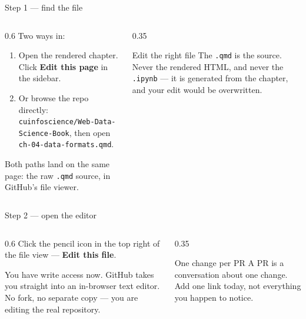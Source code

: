 \documentclass[9pt,aspectratio=169]{beamer}
\begin{document}
\begin{frame}{Step 1 --- find the file}
    \begin{columns}[T]
        \begin{column}{0.6\textwidth}
            Two ways in:
            \begin{enumerate}\small
                \item Open the rendered chapter. Click \textbf{Edit this page} in the sidebar.
                \item Or browse the repo directly: \texttt{cuinfoscience/Web-Data-Science-Book}, then open \texttt{ch-04-data-formats.qmd}.
            \end{enumerate}

            \medskip
            Both paths land on the same page: the raw \texttt{.qmd} source, in GitHub's file viewer.
        \end{column}
        \begin{column}{0.35\textwidth}
            \begin{alertblock}{Edit the right file}
                \footnotesize The \texttt{.qmd} is the source. Never the rendered HTML, and never the \texttt{.ipynb} --- it is generated from the chapter, and your edit would be overwritten.
            \end{alertblock}
        \end{column}
    \end{columns}
\end{frame}

\begin{frame}{Step 2 --- open the editor}
    \begin{columns}[T]
        \begin{column}{0.6\textwidth}
            Click the pencil icon in the top right of the file view --- \textbf{Edit this file}.

            \medskip
            You have write access now. GitHub takes you straight into an in-browser text editor. No fork, no separate copy --- you are editing the real repository.
        \end{column}
        \begin{column}{0.35\textwidth}
            \begin{alertblock}{One change per PR}
                \footnotesize A PR is a conversation about one change. Add one link today, not everything you happen to notice.
            \end{alertblock}
        \end{column}
    \end{columns}
\end{frame}
\end{document}
